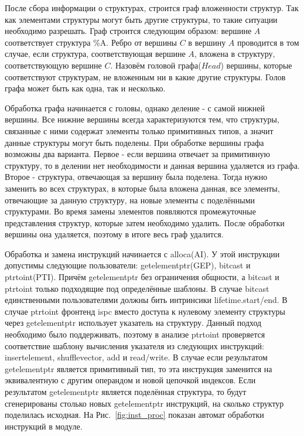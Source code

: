 После сбора информации о структурах, строится граф вложенности структур.
Так как элементами структуры могут быть другие структуры, то такие ситуации необходимо разрешать.
Граф строится следующим образом: вершине $A$ соответствует структура \%A.
Ребро от вершины $C$ в вершину $A$ проводится в том случае, если структура, соответствующая вершине $A$, вложена в структуру, соответствующую вершине $C$.
Назовём головой графа($Head$) вершины, которые соответствуют структурам, не вложенным ни в какие другие структуры.
Голов графа может быть как одна, так и несколько.

Обработка графа начинается с головы, однако деление - с самой нижней вершины.
Все нижние вершины всегда характеризуются тем, что структуры, связанные с ними содержат элементы только примитивных типов, а значит данные структуры могут быть поделены.
При обработке вершины графа возможны два варианта.
Первое - если вершина отвечает за примитивную структуру, то в делении нет необходимости и данная вершина удаляется из графа.
Второе - структура, отвечающая за вершину была поделена.
Тогда нужно заменить во всех структурах, в которые была вложена данная, все элементы, отвечающие за данную структуру, на новые элементы с поделёнными структурами.
Во время замены элементов появляются промежуточные представления структур, которые затем необходимо удалить.
После обработки вершины она удаляется, поэтому в итоге весь граф удалится.

Обработка и замена инструкций начинается с alloca(AI).
У этой инструкции допустимы следующие пользователи: getelementptr(GEP), bitcast и ptrtoint(PTI).
Причём getelementptr без ограничения общности, а bitcast и ptrtoint только подходящие под определённые шаблоны.
В случае bitcast единственными пользователями должны бить интринсики lifetime.start/end.
В случае ptrtoint фронтенд ispc вместо доступа к нулевому элементу структуры через getelementptr использует указатель на структуру.
Данный подход необходимо было поддерживать, поэтому в анализе ptrtoint проверяется соответствие шаблону вычисления указателя из следующих инструкций: insertelement, shufflevector, add и read/write.
В случае если результатом getelementptr является примитивный тип, то эта инструкция заменится на эквивалентную с другим операндом и новой цепочкой индексов.
Если результатом getelementptr является поделённая структура, то будут сгенерированы столько новых getelementptr инструкций, на сколько структур поделилась исходная.
На Рис.~\ref{fig:inst_proc} показан автомат обработки инструкций в модуле.

